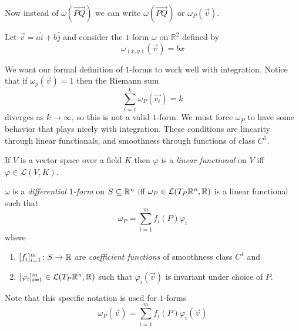 \documentclass[notes]{subfiles}
\begin{document}
Now instead of $\omega(\vec{PQ})$ we can write $\omega(\vec{PQ})$ or $\omega_{P}(\vec{v})$.

\begin{example}
    Let $\vec{v} = a\hat{i} + b\hat{j}$ and consider the $1$-form $\omega$ on $\mathbb{R}^2$ defined by
    \[
        \omega_{(x, y)}(\vec{v}) = bx
    \]
\end{example}

We want our formal definition of $1$-forms to work well with integration. Notice that if $\omega_p(\vec{v}) = 1$ then the Riemann sum
\[
    \sum_{i = 1}^k \omega_P(\vec{v_i}) = k
\]
diverges as $k \to \infty$, so this is not a valid $1$-form. We must force $\omega_P$ to have some behavior that plays nicely with integration. These conditions are linearity through linear functionals, and smoothness through functions of class $C^1$.

\begin{definition}
    If $V$ is a vector space over a field $K$ then $\varphi$ is a \textit{linear functional} on $V$ iff $\varphi \in \mathcal{L}(V, K)$.
\end{definition}

\begin{definition}
    $\omega$ is a \textit{differential $1$-form} on $S \subseteq \mathbb{R}^n$ iff $\omega_P \in \mathcal{L}(T_P \mathbb{R}^n, \mathbb{R})$ is a linear functional such that
    \[
        \omega_P = \sum_{i = 1}^m f_i(P)\varphi_i
    \]
    where
    \begin{enumerate}[label = \arabic*)]
        \item $[f_i]_{i = 1}^m\colon S \to \mathbb{R}$ are \textit{coefficient functions} of smoothness class $C^1$ and
        \item $[\varphi_i]_{i = 1}^m \in \mathcal{L}(T_P \mathbb{R}^n, \mathbb{R})$ such that $\varphi_i(\vec{v})$ is invariant under choice of $P$.
    \end{enumerate}
    Note that this specific notation is used for $1$-forms
    \[
        \omega_P(\vec{v}) = \sum_{i = 1}^m f_i(P)\varphi_i(\vec{v})
    \]
\end{definition}
\end{document}
